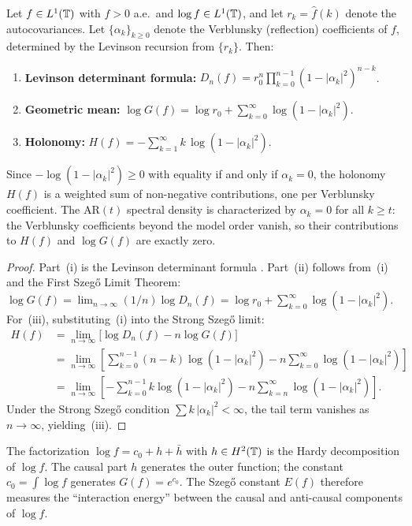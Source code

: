 \begin{proposition}\label{prop:verblunsky}
Let $f \in L^1(\mathbb{T})$ with $f > 0$ a.e.\ and $\log f \in L^1(\mathbb{T})$, and let $r_k = \widehat{f}(k)$ denote the autocovariances. Let $\{\alpha_k\}_{k \geq 0}$ denote the Verblunsky (reflection) coefficients of $f$, determined by the Levinson recursion from $\{r_k\}$. Then:
\begin{enumerate}[label=(\roman*)]
\item \textbf{Levinson determinant formula:} $D_n(f) = r_0^n \prod_{k=0}^{n-1} (1 - |\alpha_k|^2)^{n-k}$.
\item \textbf{Geometric mean:} $\log G(f) = \log r_0 + \sum_{k=0}^{\infty} \log(1 - |\alpha_k|^2)$.
\item \textbf{Holonomy:} $H(f) = -\sum_{k=1}^{\infty} k\, \log(1 - |\alpha_k|^2)$.
\end{enumerate}
Since $-\log(1 - |\alpha_k|^2) \geq 0$ with equality if and only if $\alpha_k = 0$, the holonomy $H(f)$ is a weighted sum of non-negative contributions, one per Verblunsky coefficient. The AR$(t)$ spectral density is characterized by $\alpha_k = 0$ for all $k \geq t$: the Verblunsky coefficients beyond the model order vanish, so their contributions to $H(f)$ and $\log G(f)$ are exactly zero.
\end{proposition}

\begin{proof}
Part~(i) is the Levinson determinant formula \cite[Theorem~1.5.7]{Simon}. Part~(ii) follows from~(i) and the First Szeg\H{o} Limit Theorem: $\log G(f) = \lim_{n \to \infty} (1/n)\log D_n(f) = \log r_0 + \sum_{k=0}^{\infty}\log(1-|\alpha_k|^2)$. For~(iii), substituting~(i) into the Strong Szeg\H{o} limit:
\begin{align*}
H(f) &= \lim_{n \to \infty}\bigl[\log D_n(f) - n\log G(f)\bigr] \\
&= \lim_{n \to \infty}\left[\sum_{k=0}^{n-1}(n-k)\log(1-|\alpha_k|^2) - n\sum_{k=0}^{\infty}\log(1-|\alpha_k|^2)\right] \\
&= \lim_{n \to \infty}\left[-\sum_{k=0}^{n-1}k\log(1-|\alpha_k|^2) - n\sum_{k=n}^{\infty}\log(1-|\alpha_k|^2)\right].
\end{align*}
Under the Strong Szeg\H{o} condition $\sum k\,|\alpha_k|^2 < \infty$, the tail term vanishes as $n \to \infty$, yielding~(iii).
\end{proof}

The factorization $\log f = c_0 + h + \bar{h}$ with $h \in H^2(\mathbb{T})$ is the Hardy decomposition of $\log f$. The causal part $h$ generates the outer function; the constant $c_0 = \int \log f$ generates $G(f) = e^{c_0}$. The Szeg\H{o} constant $E(f)$ therefore measures the ``interaction energy'' between the causal and anti-causal components of $\log f$.

